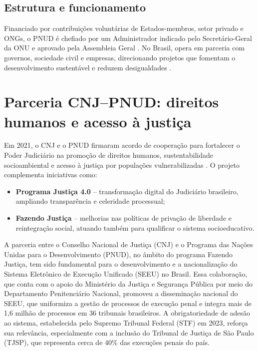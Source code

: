\begin{description}
\subsection{Estrutura e funcionamento} 
Financiado por contribuições voluntárias de Estados-membros, setor privado e
ONGs, o PNUD é chefiado por um Administrador indicado pelo Secretário-Geral da
ONU e aprovado pela Assembleia Geral \cite{undp2025onu}. No Brasil, opera em
parceria com governos, sociedade civil e empresas, direcionando projetos que
fomentam o desenvolvimento sustentável e reduzem desigualdades
\cite{undp2025sobre}.

\section{Parceria CNJ–PNUD: direitos humanos e acesso à justiça}
\label{sec:cnj-pnud}

Em 2021, o CNJ e o PNUD firmaram acordo de
cooperação para fortalecer o Poder Judiciário na promoção de direitos humanos,
sustentabilidade socioambiental e acesso à justiça por populações
vulnerabilizadas \cite{undp2021pnudcnj, undp2025pnudcnj}. O projeto complementa iniciativas como:
\begin{itemize}
  \item \textbf{Programa Justiça 4.0} \cite{Parceriapnudcnj} -- transformação digital do Judiciário
        brasileiro, ampliando transparência e celeridade processual;
  \item \textbf{Fazendo Justiça} \cite{fazendoJustica} -- melhorias nas políticas de privação de
        liberdade e reintegração social, atuando também para qualificar o sistema socioeducativo.
\end{itemize}
    
A parceria entre o Conselho Nacional de Justiça (CNJ) e o Programa das Nações Unidas para o Desenvolvimento (PNUD), no âmbito do programa Fazendo Justiça, tem sido fundamental para o desenvolvimento e a nacionalização do Sistema Eletrônico de Execução Unificado (SEEU) no Brasil. 
Essa colaboração, que conta com o apoio do Ministério da Justiça e Segurança Pública por meio do Departamento Penitenciário Nacional, promoveu a disseminação nacional do SEEU, que uniformiza a gestão de processos de execução penal e integra mais de 1,6 milhão de processos em 36 tribunais brasileiros. A obrigatoriedade de adesão ao sistema, estabelecida pelo Supremo Tribunal Federal (STF) em 2023, reforça sua relevância, especialmente com a inclusão do Tribunal de Justiça de São Paulo (TJSP), que representa cerca de 40\% das execuções penais do país. 


\end{description}
